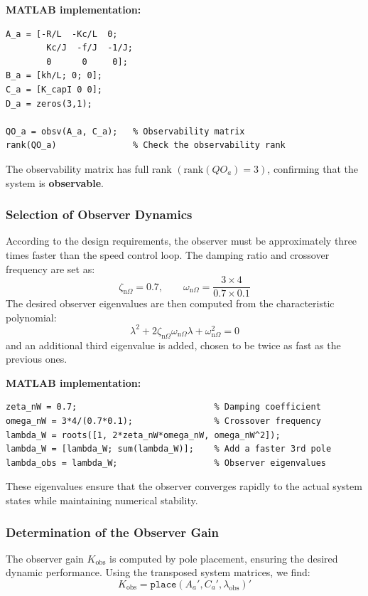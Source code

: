 \documentclass{rapportCS}
\begin{document}
\noindent\textbf{MATLAB implementation:}
\begin{verbatim}
A_a = [-R/L  -Kc/L  0;
        Kc/J  -f/J  -1/J;
        0      0     0];
B_a = [kh/L; 0; 0];
C_a = [K_capI 0 0];
D_a = zeros(3,1);

QO_a = obsv(A_a, C_a);   % Observability matrix
rank(QO_a)               % Check the observability rank
\end{verbatim}

\noindent The observability matrix has full rank $(\mathrm{rank}(QO_a)=3)$, confirming that the system is \textbf{observable}.


\subsubsection{Selection of Observer Dynamics}

According to the design requirements, the observer must be approximately three times faster than the speed control loop.  
The damping ratio and crossover frequency are set as:
\[
\zeta_{\mathrm{n}\Omega} = 0.7, \qquad \omega_{\mathrm{n}\Omega} = \frac{3\times4}{0.7\times0.1}
\]
The desired observer eigenvalues are then computed from the characteristic polynomial:
\[
\lambda^2 + 2\zeta_{\mathrm{n}\Omega}\omega_{\mathrm{n}\Omega}\lambda + \omega_{\mathrm{n}\Omega}^2 = 0
\]
and an additional third eigenvalue is added, chosen to be twice as fast as the previous ones.

\noindent\textbf{MATLAB implementation:}
\begin{verbatim}
zeta_nW = 0.7;                           % Damping coefficient
omega_nW = 3*4/(0.7*0.1);                % Crossover frequency
lambda_W = roots([1, 2*zeta_nW*omega_nW, omega_nW^2]);
lambda_W = [lambda_W; sum(lambda_W)];    % Add a faster 3rd pole
lambda_obs = lambda_W;                   % Observer eigenvalues
\end{verbatim}

\noindent These eigenvalues ensure that the observer converges rapidly to the actual system states while maintaining numerical stability.


\subsubsection{Determination of the Observer Gain}

The observer gain $K_{\mathrm{obs}}$ is computed by pole placement, ensuring the desired dynamic performance.  
Using the transposed system matrices, we find:
\begin{equation*}
K_{\mathrm{obs}} = \texttt{place}(A_a', C_a', \lambda_{\mathrm{obs}})'
\end{equation*}
\end{document}
